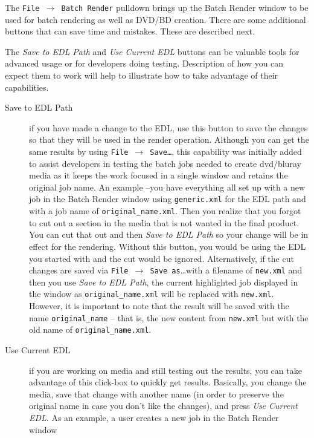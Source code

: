 The \texttt{File $\rightarrow$ Batch Render} pulldown brings up the Batch Render window to be used for batch rendering as well as DVD/BD creation.  There are some additional buttons that can save time and mistakes.  These are described next.

The \textit{Save to EDL Path} and \textit{Use Current EDL} buttons can be valuable tools for advanced usage or for developers doing testing.  Description of how you can expect them to work will help to illustrate how to take advantage of their capabilities.

\begin{description}
    \item[Save to EDL Path] if you have made a change to the EDL, use this button to save the changes so
    that they will be used in the render operation.  Although you can get the same results by using
    \texttt{File  $\rightarrow$  Save\dots}, this capability was initially added to assist developers in testing the batch jobs needed to create dvd/bluray media as it keeps the work focused in a single window and retains the original
    job name.  An example --you have everything all set up with a new job in the Batch Render window
    using \texttt{generic.xml} for the EDL path and with a job name of \texttt{original\_name.xml}.  Then you realize
    that you forgot to cut out a section in the media that is not wanted in the final product.  You can cut
    that out and then \textit{Save to EDL Path} so your change will be in effect for the rendering.  Without this
    button, you would be using the EDL you started with and the cut would be ignored.  Alternatively, if
    the cut changes are saved via \texttt{File  $\rightarrow$  Save as}\dots with a filename of \texttt{new.xml} and then you use \textit{Save to EDL Path}, the current highlighted job displayed in the window as \texttt{original\_name.xml} will be
    replaced with \texttt{new.xml}.  However, it is important to note that the result will be saved with the name
    \texttt{original\_name} – that is, the new content from \texttt{new.xml} but with the old name of \texttt{original\_name.xml}.
    \item[Use Current EDL] if you are working on media and still testing out the results, you can take
    advantage of this click-box to quickly get results.  Basically, you change the media, save that change
    with another name (in order to preserve the original name in case you don't like the changes), and
    press \textit{Use Current EDL}.  As an example, a user creates a new job in the Batch Render window

\end{description}
